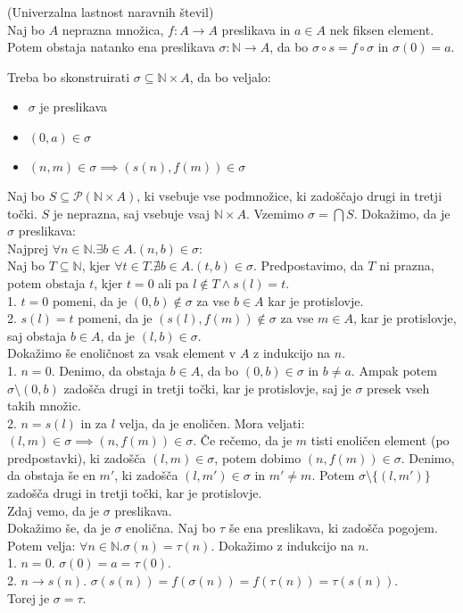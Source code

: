 \begin{trditev}
    (Univerzalna lastnost naravnih števil) \\
    Naj bo $A$ neprazna množica, $f: A \to A$ preslikava in $a \in A$ nek fiksen element.
    Potem obstaja natanko ena preslikava $\sigma: \mathbb{N} \to A$, da bo $\sigma \circ s = f \circ \sigma$ in $\sigma(0) = a$.
\end{trditev}
\begin{dokaz}
    Treba bo skonstruirati $\sigma \subseteq \mathbb{N} \times A$, da bo veljalo:
    \begin{itemize}
        \item $\sigma$ je preslikava
        \item $(0, a) \in \sigma$
        \item $(n, m) \in \sigma \implies (s(n), f(m)) \in \sigma$
    \end{itemize}
    Naj bo $S \subseteq \mathcal{P}(\mathbb{N} \times A)$, ki vsebuje vse podmnožice, ki zadoščajo drugi in tretji točki.
    $S$ je neprazna, saj vsebuje vsaj $\mathbb{N} \times A$.
    Vzemimo $\sigma = \bigcap S$.
    Dokažimo, da je $\sigma$ preslikava: \\
    Najprej $\forall n \in \mathbb{N}. \exists b \in A. (n, b) \in \sigma$: \\
    Naj bo $T \subseteq \mathbb{N}$, kjer $\forall t \in T. \nexists b \in A. (t, b) \in \sigma$.
    Predpostavimo, da $T$ ni prazna, potem obstaja $t$, kjer $t = 0$ ali pa $l \notin T \wedge s(l) = t$. \\
    1. $t = 0$ pomeni, da je $(0, b) \notin \sigma$ za vse $b \in A$ kar je protislovje. \\
    2. $s(l) = t$ pomeni, da je $(s(l), f(m)) \notin \sigma$ za vse $m \in A$, kar je protislovje, saj obstaja $b \in A$, da je $(l, b) \in \sigma$. \\
    Dokažimo še enoličnost za vsak element v $A$ z indukcijo na $n$. \\
    1. $n = 0$.
    Denimo, da obstaja $b \in A$, da bo $(0, b) \in \sigma$ in $b \neq a$.
    Ampak potem $\sigma \setminus {(0, b)}$ zadošča drugi in tretji točki, kar je protislovje, saj je $\sigma$ presek vseh takih množic. \\
    2. $n = s(l)$ in za $l$ velja, da je enoličen.
    Mora veljati: $(l, m) \in \sigma \implies (n, f(m)) \in \sigma$.
    Če rečemo, da je $m$ tisti enoličen element (po predpostavki), ki zadošča $(l, m) \in \sigma$, potem dobimo $(n, f(m)) \in \sigma$.
    Denimo, da obstaja še en $m'$, ki zadošča $(l, m') \in \sigma$ in $m' \neq m$.
    Potem $\sigma \setminus \{(l, m')\}$ zadošča drugi in tretji točki, kar je protislovje. \\
    Zdaj vemo, da je $\sigma$ preslikava. \\
    Dokažimo še, da je $\sigma$ enolična.
    Naj bo $\tau$ še ena preslikava, ki zadošča pogojem.
    Potem velja: $\forall n \in \mathbb{N}. \sigma(n) = \tau(n)$.
    Dokažimo z indukcijo na $n$. \\
    1. $n = 0$.
    $\sigma(0) = a = \tau(0)$. \\
    2. $n \to s(n)$.
    $\sigma(s(n)) = f(\sigma(n)) = f(\tau(n)) = \tau(s(n))$. \\
    Torej je $\sigma = \tau$.
\end{dokaz}
